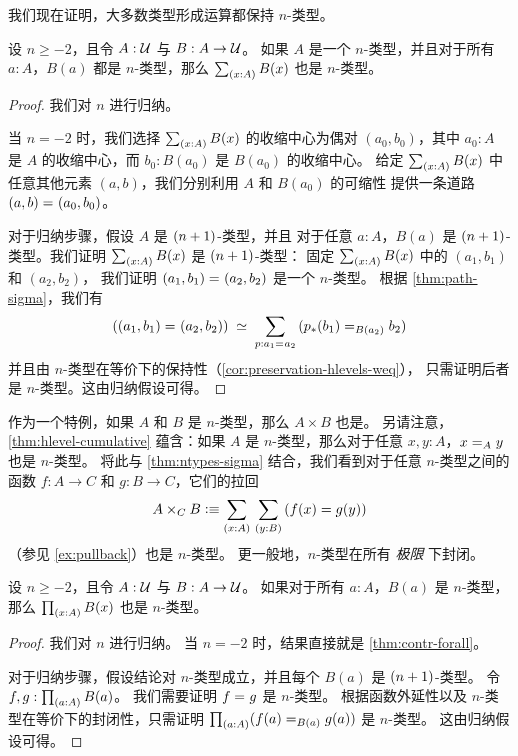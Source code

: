 我们现在证明，大多数类型形成运算都保持 $n$-类型。

\begin{thm}\label{thm:ntypes-sigma}
 设 $n \geq -2$，且令 $A : \type$ 与 $B : A \to \type$。
 如果 $A$ 是一个 $n$-类型，并且对于所有 $a : A$，$B(a)$ 都是 $n$-类型，那么
 $\sm{x : A} B(x)$ 也是 $n$-类型。
\end{thm}

\begin{proof}
 我们对 $n$ 进行归纳。

 当 $n = -2$ 时，我们选择 $\sm{x : A} B(x)$ 的收缩中心为偶对
       $(a_0, b_0)$，其中 $a_0 : A$ 是 $A$ 的收缩中心，而 $b_0 : B(a_0)$ 是 $B(a_0)$ 的收缩中心。
       给定 $\sm{x : A} B(x)$ 中任意其他元素 $(a,b)$，我们分别利用 $A$ 和 $B(a_0)$ 的可缩性
       提供一条道路 $\id{(a, b)}{(a_0,b_0)}$。

 对于归纳步骤，假设 $A$ 是 $\nplusone$-类型，并且
         对于任意 $a : A$，$B(a)$ 是 $\nplusone$-类型。我们证明 $\sm{x : A} B(x)$ 是 $\nplusone$-类型：
      固定 $\sm{x : A} B(x)$ 中的 $(a_1, b_1)$ 和 $(a_2,b_2)$，
     我们证明 $\id{(a_1, b_1)}{(a_2,b_2)}$ 是一个 $n$-类型。
      根据 \cref{thm:path-sigma}，我们有
      \[ \eqvspaced{(\id{(a_1, b_1)}{(a_2,b_2)})}{\sm{p : \id{a_1}{a_2}} (\id[B(a_2)]{\trans{p}{b_1}}{b_2})} \]
   并且由 $n$-类型在等价下的保持性（\cref{cor:preservation-hlevels-weq}），
   只需证明后者是 $n$-类型。这由归纳假设可得。
\end{proof}

作为一个特例，如果 $A$ 和 $B$ 是 $n$-类型，那么 $A\times B$ 也是。
另请注意，\cref{thm:hlevel-cumulative} 蕴含：如果 $A$ 是 $n$-类型，那么对于任意 $x,y:A$，$\id[A]xy$ 也是 $n$-类型。
将此与 \cref{thm:ntypes-sigma} 结合，我们看到对于任意 $n$-类型之间的函数 $f:A\to C$ 和 $g:B\to C$，它们的拉回
\[ A\times_C B \defeq \sm{x:A}{y:B} (f(x)=g(y)) \]
（参见 \cref{ex:pullback}）也是 $n$-类型。
更一般地，$n$-类型在所有 \emph{极限} 下封闭。

\begin{thm}\label{thm:hlevel-prod}
 设 $n\geq -2$，且令 $A : \type$ 与 $B : A \to \type$。
 如果对于所有 $a : A$，$B(a)$ 是 $n$-类型，那么 $\prd{x : A} B(x)$ 也是 $n$-类型。
\end{thm}

\begin{proof}
  我们对 $n$ 进行归纳。
  当 $n = -2$ 时，结果直接就是 \cref{thm:contr-forall}。

  对于归纳步骤，假设结论对 $n$-类型成立，并且每个 $B(a)$ 是 $\nplusone$-类型。
  令 $f, g : \prd{a:A}B(a)$。
  我们需要证明 $\id{f}{g}$ 是 $n$-类型。
  根据函数外延性以及 $n$-类型在等价下的封闭性，只需证明 $\prd{a : A} (\id[B(a)]{f(a)}{g(a)})$ 是 $n$-类型。
  这由归纳假设可得。
\end{proof}

